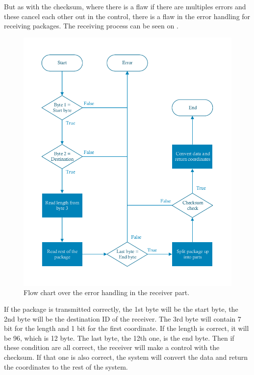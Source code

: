 But as with the checksum, where there is a flaw if there are multiples errors and these cancel each other out in the control, there is a flaw in the error handling for receiving packages. The receiving process can be seen on .

\begin{figure}[H]
\centering
\includegraphics[scale=0.7]{figures/FlowReceiver.pdf}
\caption{Flow chart over the error handling in the receiver part.}
\label{FlowReceiver}
\end{figure}

If the package is transmitted correctly, the 1st byte will be the start byte, the 2nd byte will be the destination ID of the receiver. The 3rd byte will contain 7 bit for the length and 1 bit for the first coordinate. If the length is correct, it will be 96, which is 12 byte. The last byte, the 12th one, is the end byte. Then if these condition are all correct, the receiver will make a control with the checksum. If that one is also correct, the system will convert the data and return the coordinates to the rest of the system.

